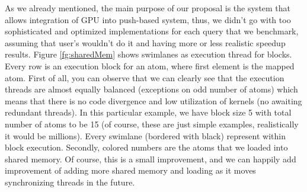 \documentclass[12pt,letterpaper]{report}
\begin{document}
As we already mentioned, the main purpose of our proposal is the system that allows integration of GPU into push-based system, thus, we didn't go with too sophisticated and optimized implementations for each query that we benchmark, assuming that user's wouldn't do it and having more or less realistic speedup results. Figure \ref{fg:sharedMem} shows swimlanes as execution thread for blocks. Every row is an execution block for an atom, where first element is the mapped atom. First of all, you can observe that we can clearly see that the execution threads are almost equally balanced (exceptions on odd number of atoms) which means that there is no code divergence and low utilization of kernels (no awaiting redundant threads). In this particular example, we have block size 5 with total number of atoms to be 15 (of course, these are just simple examples, realistically it would be millions). Every swimlane (bordered with black) represent within block execution. Secondly, colored numbers are the atoms that we loaded into shared memory. Of course, this is a small improvement, and we can happily add improvement of adding more shared memory and loading as it moves synchronizing threads in the future.
\end{document}
